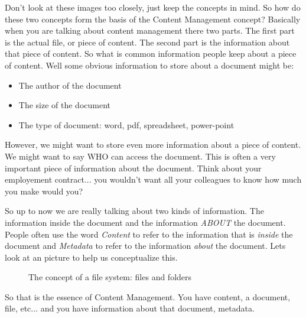 Don't look at these images too closely, just keep the concepts in
mind.  So how do these two concepts form the basis of the Content
Management concept?  Basically when you are talking about content
management there two parts.  The first part is the actual file, or
piece of content.  The second part is the information about that piece
of content.  So what is common information people keep about a piece
of content.  Well some obvious information to store about a document
might be:

\begin{itemize}  
\item The author of the document
\item The size of the document
\item The type of document: word, pdf, spreadsheet, power-point
\end{itemize}

However, we might want to store even more information about a piece of
content.  We might want to say WHO can access the document.  This is
often a very important piece of information about the document.  Think
about your employement contract... you wouldn't want all your
colleagues to know how much you make would you?
  
So up to now we are really talking about two kinds of information.
The information inside the document and the information \emph{ABOUT}
the document.  People often use the word \emph{Content} to refer to
the information that is \emph{inside} the document and \emph{Metadata}
to refer to the information \emph{about} the document.  Lets look at
an picture to help us conceptualize this.

\begin{figure}[h!]
  \centering
  \caption{The concept of a file system: files and folders}
\end{figure}
  
So that is the essence of Content Management.  You have content, a
document, file, etc... and you have information about that document,
metadata.

\clearpage